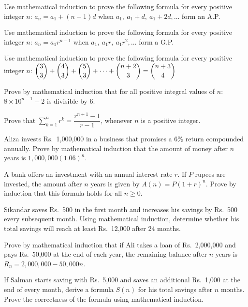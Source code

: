 \documentclass[11pt,a4paper]{article}
\begin{document}
\begin{longlist}
\item Use mathematical induction to prove the following formula for every positive integer $n$: $a_n=a_1+(n-1)d$ when $a_1,\ a_1+d,\ a_1+2d,\ldots$ form an A.P.

\item Use mathematical induction to prove the following formula for every positive integer $n$: $a_n=a_1r^{n-1}$ when $a_1,\ a_1r,\ a_1r^2,\ldots$ form a G.P.

\item Use mathematical induction to prove the following formula for every positive integer $n$: $\dbinom{3}{3}+\dbinom{4}{3}+\dbinom{5}{3}+\cdots+\dbinom{n+2}{3}=\dbinom{n+3}{4}$

\item Prove by mathematical induction that for all positive integral values of $n$: $8\times 10^{n-1}-2$ is divisible by 6.

\item Prove that $\displaystyle\sum_{k=1}^{n} r^k=\dfrac{r^{n+1}-1}{r-1}$, whenever $n$ is a positive integer.

\item Aliza invests Rs.\ 1,000,000 in a business that promises a 6\% return compounded annually. Prove by mathematical induction that the amount of money after $n$ years is $1{,}000{,}000(1.06)^n$.

\item A bank offers an investment with an annual interest rate $r$. If $P$ rupees are invested, the amount after $n$ years is given by $A(n)=P(1+r)^n$. Prove by induction that this formula holds for all $n\geq 0$.

\item Sikandar saves Rs.\ 500 in the first month and increases his savings by Rs.\ 500 every subsequent month. Using mathematical induction, determine whether his total savings will reach at least Rs.\ 12,000 after 24 months.

\item Prove by mathematical induction that if Ali takes a loan of Rs.\ 2,000,000 and pays Rs.\ 50,000 at the end of each year, the remaining balance after $n$ years is $R_n=2{,}000{,}000-50{,}000n$.

\item If Salman starts saving with Rs.\ 5,000 and saves an additional Rs.\ 1,000 at the end of every month, derive a formula $S(n)$ for his total savings after $n$ months. Prove the correctness of the formula using mathematical induction.


\end{longlist}
\end{document}
